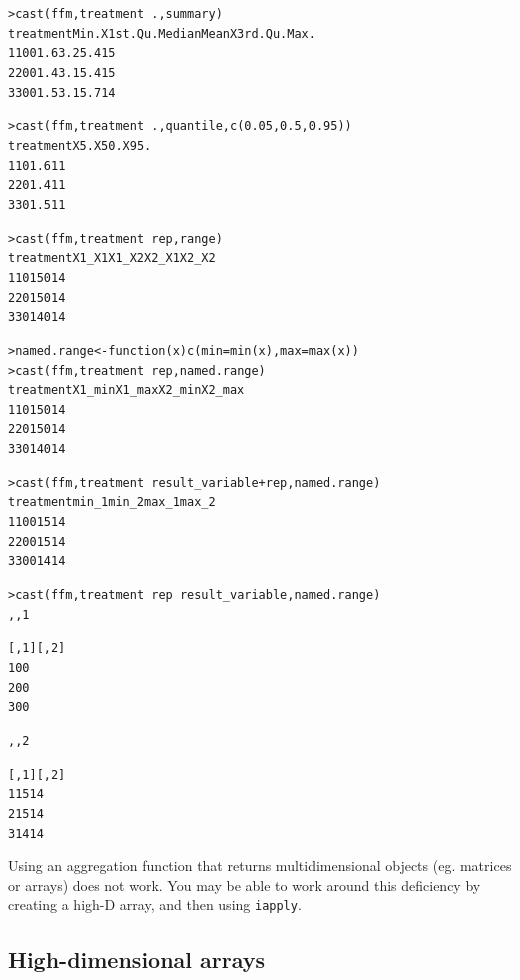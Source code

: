 \documentclass[oneside,letterpaper]{scrartcl}
\begin{document}
\begin{alltt}
> cast(ffm, treatment ~ ., summary)
  treatment Min. X1st.Qu. Median Mean X3rd.Qu. Max.
1         1    0        0    1.6  3.2      5.4   15
2         2    0        0    1.4  3.1      5.4   15
3         3    0        0    1.5  3.1      5.7   14

> cast(ffm, treatment ~ ., quantile, c(0.05, 0.5, 0.95))
  treatment X5. X50. X95.
1         1   0  1.6   11
2         2   0  1.4   11
3         3   0  1.5   11

> cast(ffm, treatment ~ rep, range)
  treatment X1_X1 X1_X2 X2_X1 X2_X2
1         1     0    15     0    14
2         2     0    15     0    14
3         3     0    14     0    14

> named.range <- function(x) c(min = min(x), max = max(x))
> cast(ffm, treatment ~ rep, named.range)
  treatment X1_min X1_max X2_min X2_max
1         1      0     15      0     14
2         2      0     15      0     14
3         3      0     14      0     14

> cast(ffm, treatment ~ result_variable + rep, named.range)
  treatment min_1 min_2 max_1 max_2
1         1     0     0    15    14
2         2     0     0    15    14
3         3     0     0    14    14

> cast(ffm, treatment ~ rep ~ result_variable, named.range)
, , 1

  [,1] [,2]
1    0    0
2    0    0
3    0    0

, , 2

  [,1] [,2]
1   15   14
2   15   14
3   14   14


\end{alltt}

Using an aggregation function that returns multidimensional objects (eg. matrices or arrays) does not work.  You may be able to work around this deficiency by creating a high-D array, and then using {\tt iapply}.

\subsection{High-dimensional arrays}\label{sub:high_dimensional_arrays}
\end{document}
